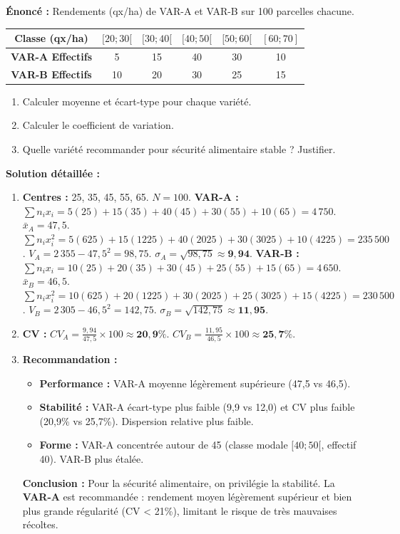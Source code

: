 \documentclass[11pt]{article}
\begin{document}
\begin{exoresolu}
\textbf{Énoncé :} Rendements (qx/ha) de VAR-A et VAR-B sur 100 parcelles chacune.
\begin{center}
\begin{tabular}{|c|c|c|c|c|c|}\hline
\textbf{Classe (qx/ha)} & $[20; 30[$ & $[30; 40[$ & $[40; 50[$ & $[50; 60[$ & $[60; 70]$ \\ \hline
\textbf{VAR-A Effectifs} & 5 & 15 & 40 & 30 & 10 \\ \hline
\textbf{VAR-B Effectifs} & 10 & 20 & 30 & 25 & 15 \\ \hline
\end{tabular}
\end{center}
\begin{enumerate}
    \item Calculer moyenne et écart-type pour chaque variété.
    \item Calculer le coefficient de variation.
    \item Quelle variété recommander pour sécurité alimentaire stable ? Justifier.
\end{enumerate}
\tcblower
\textbf{Solution détaillée :}
\begin{enumerate}
    \item \textbf{Centres :} 25, 35, 45, 55, 65. $N=100$.
    \textbf{VAR-A :}
    $\sum n_i x_i = 5(25)+15(35)+40(45)+30(55)+10(65) = 4\,750$. $\bar{x}_A = 47,5$.
    $\sum n_i x_i^2 = 5(625)+15(1225)+40(2025)+30(3025)+10(4225) = 235\,500$.
    $V_A = 2\,355 - 47,5^2 = 98,75$. $\sigma_A = \sqrt{98,75} \approx \mathbf{9,94}$.
    \textbf{VAR-B :}
    $\sum n_i x_i = 10(25)+20(35)+30(45)+25(55)+15(65) = 4\,650$. $\bar{x}_B = 46,5$.
    $\sum n_i x_i^2 = 10(625)+20(1225)+30(2025)+25(3025)+15(4225) = 230\,500$.
    $V_B = 2\,305 - 46,5^2 = 142,75$. $\sigma_B = \sqrt{142,75} \approx \mathbf{11,95}$.
    \item \textbf{CV :}
    $CV_A = \frac{9,94}{47,5} \times 100 \approx \mathbf{20,9\%}$.
    $CV_B = \frac{11,95}{46,5} \times 100 \approx \mathbf{25,7\%}$.
    \item \textbf{Recommandation :}
    \begin{itemize}
        \item \textbf{Performance :} VAR-A moyenne légèrement supérieure (47,5 vs 46,5).
        \item \textbf{Stabilité :} VAR-A écart-type plus faible (9,9 vs 12,0) et CV plus faible (20,9\% vs 25,7\%). Dispersion relative plus faible.
        \item \textbf{Forme :} VAR-A concentrée autour de 45 (classe modale $[40;50[$, effectif 40). VAR-B plus étalée.
    \end{itemize}
    \textbf{Conclusion :} Pour la sécurité alimentaire, on privilégie la stabilité. La \textbf{VAR-A} est recommandée : rendement moyen légèrement supérieur et bien plus grande régularité (CV < 21\%), limitant le risque de très mauvaises récoltes.
\end{enumerate}
\end{exoresolu}
\end{document}
